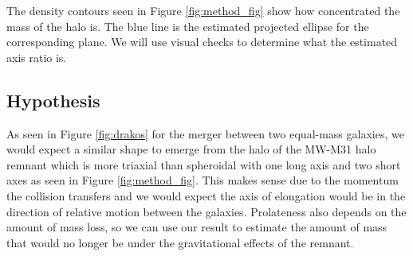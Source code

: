 \documentclass[linenumbers, twocolumn]{aastex631}
\begin{document}
The density contours seen in Figure \ref{fig:method_fig} show how concentrated the mass of the halo is. The blue line is the estimated projected ellipse for the corresponding plane. We will use visual checks to determine what the estimated axis ratio is.


\subsection{Hypothesis} \label{sec:hypothesis}
As seen in Figure \ref{fig:drakos} for the merger between two equal-mass galaxies, we would expect a similar shape to emerge from the halo of the MW-M31 halo remnant which is more triaxial than spheroidal with one long axis and two short axes as seen in Figure \ref{fig:method_fig}. 
This makes sense due to the momentum the collision transfers and we would expect the axis of elongation would be in the direction of relative motion between the galaxies.
Prolateness also depends on the amount of mass loss, so we can use our result to estimate the amount of mass that would no longer be under the gravitational effects of the remnant.


{}



\end{document}
